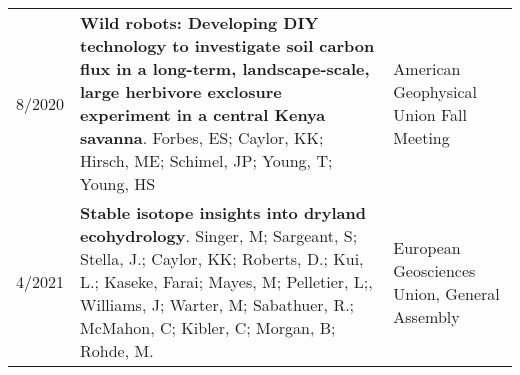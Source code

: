\begin{longtable}{lp{10.0cm}p{4.5cm}}
8/2020 & {\bf Wild robots: Developing DIY technology to investigate soil carbon flux in a long-term, landscape-scale, large herbivore exclosure experiment in a central Kenya savanna}. Forbes, ES; Caylor, KK; Hirsch, ME; Schimel, JP; Young, T; Young, HS  & American Geophysical Union Fall Meeting \\
  
4/2021 & {\bf Stable isotope insights into dryland ecohydrology}. Singer, M; Sargeant, S; Stella, J.; Caylor, KK; Roberts, D.; Kui, L.; Kaseke, Farai; Mayes, M; Pelletier, L;, Williams, J; Warter, M; Sabathuer, R.; McMahon, C; Kibler, C; Morgan, B; Rohde, M.   & European Geosciences Union, General Assembly 
 \\
 \end{longtable}

